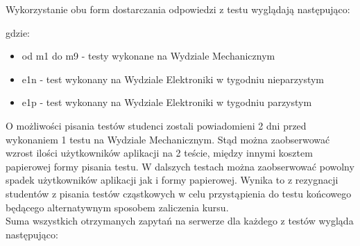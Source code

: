 \documentclass[archivemod, eng]{mgr}
\begin{document}
		Wykorzystanie obu form dostarczania odpowiedzi z testu wyglądają następująco:
			
		\begin{center}
		\end{center}
	
		gdzie:
		\begin{itemize}
			\item od m1 do m9 - testy wykonane na Wydziale Mechanicznym
			\item e1n - test wykonany na Wydziale Elektroniki w tygodniu nieparzystym
			\item e1p - test wykonany na Wydziale Elektroniki w tygodniu parzystym
		\end{itemize}
	
		O możliwości pisania testów studenci zostali powiadomieni 2 dni przed wykonaniem 1 testu na Wydziale Mechanicznym. Stąd można zaobserwować wzrost ilości użytkowników aplikacji na 2 teście, między innymi kosztem papierowej formy pisania testu. W dalszych testach można zaobserwować powolny spadek użytkowników aplikacji jak i formy papierowej. Wynika to z rezygnacji studentów z pisania testów cząstkowych w celu przystąpienia do testu końcowego będącego alternatywnym sposobem zaliczenia kursu.\\
	
		Suma wszystkich otrzymanych zapytań na serwerze dla każdego z testów wygląda następująco:
		
\end{document}
